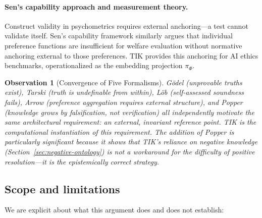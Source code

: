 \documentclass[11pt]{article}
\newtheorem{observation}{Observation}
\begin{document}
\paragraph{Sen's capability approach and measurement theory.}
Construct validity in psychometrics requires external anchoring---a test
cannot validate itself. Sen's capability framework similarly argues that
individual preference functions are insufficient for welfare evaluation
without normative anchoring external to those preferences. TIK provides this
anchoring for AI ethics benchmarks, operationalized as the embedding
projection $\pi_\Phi$.

\begin{observation}[Convergence of Five Formalisms]
G\"{o}del (unprovable truths exist), Tarski (truth is undefinable from
within), L\"{o}b (self-assessed soundness fails), Arrow (preference
aggregation requires external structure), and Popper (knowledge grows by
falsification, not verification) all independently motivate the same
architectural requirement: an external, invariant reference point. TIK is
the computational instantiation of this requirement. The addition of Popper
is particularly significant because it shows that TIK's reliance on negative
knowledge (Section~\ref{sec:negative-ontology}) is not a workaround for the
difficulty of positive resolution---it is the \textit{epistemically correct}
strategy.
\end{observation}


\subsection{Scope and limitations}
\label{app:godel-limitations}

We are explicit about what this argument does and does not establish:
\end{document}
